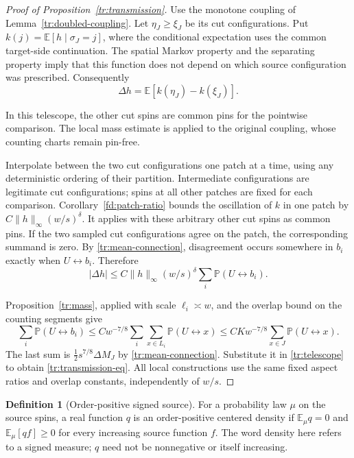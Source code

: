 \documentclass[11pt]{article}
\theoremstyle{definition}
\newtheorem{definition}[theorem]{Definition}
\theoremstyle{remark}
\numberwithin{equation}{section}
\begin{document}
\begin{proof}[Proof of Proposition~\ref{tr:transmission}]
Use the monotone coupling of Lemma~\ref{tr:doubled-coupling}. Let
$\eta_J\geq\xi_J$ be its cut configurations. Put
$k(j)=\mathbb E[h\mid\sigma_J=j]$, where the conditional expectation
uses the common target-side continuation. The spatial Markov property
and the separating property imply that this function does not depend
on which source configuration was prescribed. Consequently
\[
 \Delta h=\mathbb E[k(\eta_J)-k(\xi_J)].
\]

In this telescope, the other cut spins are common pins for the pointwise
comparison. The local mass estimate is applied to the original coupling,
whose counting charts remain pin-free.

Interpolate between the two cut configurations one patch at a time,
using any deterministic ordering of their partition. Intermediate
configurations are legitimate cut configurations; spins at all other
patches are fixed for each comparison. Corollary~\ref{fd:patch-ratio}
bounds the oscillation of $k$ in one patch by
$C\|h\|_\infty(w/s)^\delta$. It applies with these arbitrary other cut
spins as common pins. If the two sampled cut configurations agree on
the patch, the corresponding summand is zero. By
\eqref{tr:mean-connection}, disagreement occurs somewhere in $b_i$
exactly when $U\longleftrightarrow b_i$. Therefore
\begin{equation}
\label{tr:telescope}
 |\Delta h|\leq C\|h\|_\infty(w/s)^\delta
 \sum_i\mathbb P(U\longleftrightarrow b_i).
\end{equation}

Proposition~\ref{tr:mass}, applied with scale $\ell_i\asymp w$, and the
overlap bound on the counting segments give
\[
 \sum_i\mathbb P(U\longleftrightarrow b_i)
 \leq C w^{-7/8}\sum_i\sum_{x\in L_i}
               \mathbb P(U\longleftrightarrow x)
 \leq C K w^{-7/8}\sum_{x\in J}
               \mathbb P(U\longleftrightarrow x).
\]
The last sum is $\tfrac12s^{7/8}\Delta M_J$ by
\eqref{tr:mean-connection}. Substitute it in \eqref{tr:telescope} to
obtain \eqref{tr:transmission-eq}. All local constructions use the same
fixed aspect ratios and overlap constants, independently of $w/s$.
\end{proof}

\begin{definition}[Order-positive signed source]
\label{tr:order-positive}
For a probability law $\mu$ on the source spins, a real function $q$ is
an order-positive centered density if $\mathbb E_\mu q=0$ and
$\mathbb E_\mu[qf]\geq0$ for every increasing source function $f$.
The word density here refers to a signed measure; $q$ need not be
nonnegative or itself increasing.
\end{definition}
\end{document}
